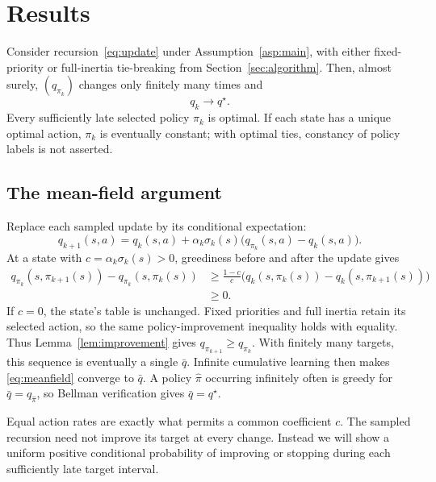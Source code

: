 \section{Results}\label{sec:results}
\begin{theorem}\label{thm:convergence}
Consider recursion~\eqref{eq:update} under
Assumption~\ref{asp:main}, with either fixed-priority or full-inertia tie-breaking from Section~\ref{sec:algorithm}. Then,
almost surely, $(q_{\pi_k})$ changes only finitely many times and
\[
q_k\longrightarrow q^\star.
\]
Every sufficiently late selected policy $\pi_k$ is optimal. If each state has a unique optimal action,
$\pi_k$ is eventually constant; with optimal ties, constancy of policy labels is not asserted.
\end{theorem}

\subsection{The mean-field argument}
Replace each sampled update by its conditional expectation:
\begin{equation}\label{eq:meanfield}
q_{k+1}(s,a)=q_k(s,a)+\alpha_k\sigma_k(s)\bigl(q_{\pi_k}(s,a)-q_k(s,a)\bigr).
\end{equation}
At a state with $c=\alpha_k\sigma_k(s)>0$, greediness before and after the update gives
\[
\begin{aligned}
q_{\pi_k}(s,\pi_{k+1}(s))-q_{\pi_k}(s,\pi_k(s))
&\ge\frac{1-c}{c}\bigl(q_k(s,\pi_k(s))-q_k(s,\pi_{k+1}(s))\bigr)\\
&\ge0.
\end{aligned}
\]
If $c=0$, the state's table is unchanged. Fixed priorities and full inertia retain its selected
action, so the same policy-improvement inequality holds with equality. Thus Lemma~\ref{lem:improvement} gives
$q_{\pi_{k+1}}\ge q_{\pi_k}$. With finitely many targets, this sequence is eventually a single $\bar q$. Infinite
cumulative learning then makes \eqref{eq:meanfield} converge to $\bar q$. A policy $\widehat\pi$ occurring infinitely often is
greedy for $\bar q=q_{\widehat\pi}$, so Bellman verification gives $\bar q=q^\star$.

Equal action rates are exactly what permits a common coefficient $c$. The sampled
recursion need not improve its target at every change. Instead we will show a uniform
positive conditional probability of improving or stopping during each sufficiently late target
interval.

